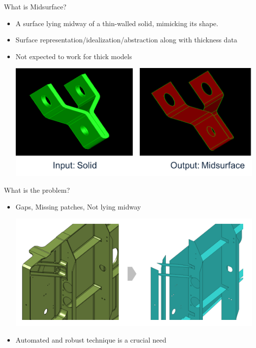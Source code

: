 \begin{frame}{What is Midsurface?}
\begin{itemize}[noitemsep,label=\textbullet,topsep=2pt,parsep=2pt,partopsep=2pt]
\item A surface lying midway of a thin-walled solid, mimicking its shape.
\item Surface representation/idealization/abstraction along with thickness data
\item Not expected to work for thick models

\vspace{1cm}

\includegraphics[width=0.85\linewidth]{../Common/images/SolidToMidsurface.png}
\end{itemize}


\end{frame}


\begin{frame}{What is the problem?}
\begin{itemize}[noitemsep,label=\textbullet,topsep=2pt,parsep=2pt,partopsep=2pt]
\item Gaps, Missing patches,  Not lying midway

\vspace{0.25cm}

\includegraphics[width=0.85\linewidth]{../Common/images/MidsurfaceErrorsMscApex}

\item  Automated and  robust technique  is a crucial need
\end{itemize}


\end{frame}

